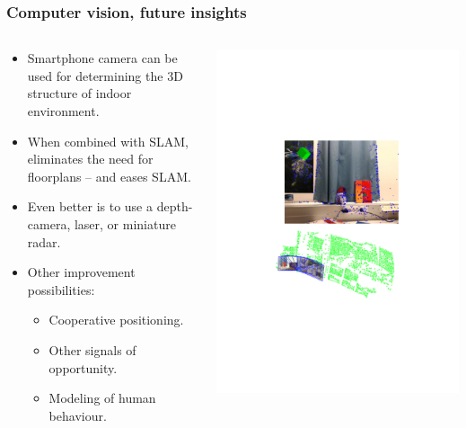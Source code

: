 \documentclass[xcolor=svgnames,english,presentation]{beamer}
\begin{document}
\begin{frame}
  \frametitle{Computer vision, future insights}

  \begin{columns}
  \begin{column}{0.51\textwidth}
  \begin{itemize}[<+->]
  \item \alert{Smartphone camera} can be used for determining the \alert{3D structure of indoor environment}.
  \item When \alert{combined with SLAM}, eliminates the need for floorplans -- and eases SLAM.
  \item Even better is to use a \alert{depth-camera, laser, or miniature radar}.
  \item Other \alert{improvement possibilities}:
  \begin{itemize}[<+->]
  \item Cooperative positioning.
  \item Other signals of opportunity.
  \item Modeling of human behaviour.
  \end{itemize}
  \end{itemize}
  \end{column}
  \begin{column}{0.49\textwidth}
  \includegraphics[width=\columnwidth]{pointcloud} \\
  \end{column}
  \end{columns}
\end{frame}
\end{document}
